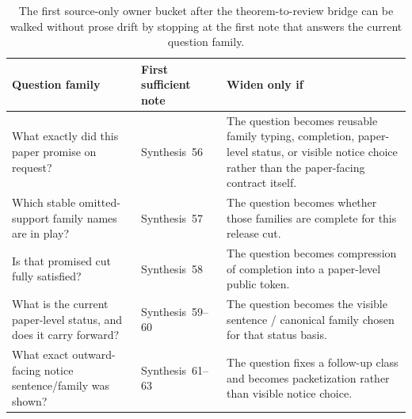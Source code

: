 \documentclass[11pt]{article}
\begin{document}
\begin{table}[t]
\centering
\small
\begin{tabularx}{\linewidth}{@{}l l X@{}}
\toprule
Question family & First sufficient note & Widen only if \\
\midrule
What exactly did this paper promise on request? & Synthesis~56 & The question becomes reusable family typing, completion, paper-level status, or visible notice choice rather than the paper-facing contract itself. \\
Which stable omitted-support family names are in play? & Synthesis~57 & The question becomes whether those families are complete for this release cut. \\
Is that promised cut fully satisfied? & Synthesis~58 & The question becomes compression of completion into a paper-level public token. \\
What is the current paper-level status, and does it carry forward? & Synthesis~59--60 & The question becomes the visible sentence / canonical family chosen for that status basis. \\
What exact outward-facing notice sentence/family was shown? & Synthesis~61--63 & The question fixes a follow-up class and becomes packetization rather than visible notice choice. \\
\bottomrule
\end{tabularx}
\caption{The first source-only owner bucket after the theorem-to-review bridge can be walked without prose drift by stopping at the first note that answers the current question family.}
\label{tab:publicrequestcontractstoprules}
\end{table}
\end{document}
